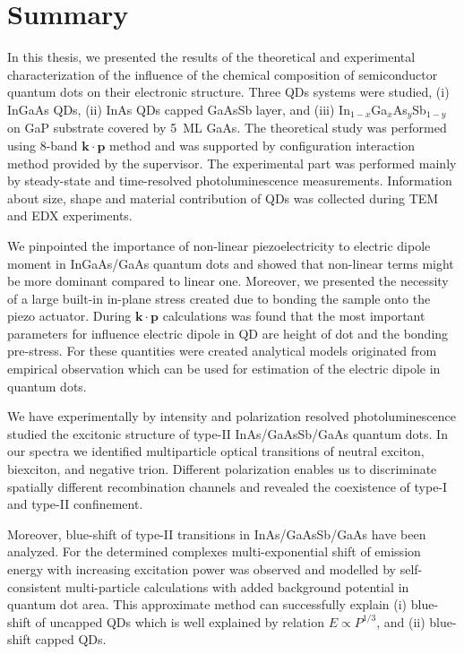 
\chapter{Summary}\label{chap:summary}

In this thesis, we presented the results of the theoretical and experimental characterization of the influence of the chemical composition of semiconductor quantum dots on their electronic structure. Three QDs systems were studied, (i) InGaAs QDs, (ii) InAs QDs capped GaAsSb layer, and (iii) In$_{1-x}$Ga$_x$As$_y$Sb$_{1-y}$ on GaP substrate covered by 5~ML GaAs. The theoretical study was performed using 8-band $\mathbf{k\cdot p}$ method and was supported by configuration interaction method provided by the supervisor. The experimental part was performed mainly by steady-state and time-resolved photoluminescence measurements. Information about size, shape and material contribution of QDs was collected during TEM and EDX experiments.

We pinpointed the importance of non-linear piezoelectricity to electric dipole moment in InGaAs/GaAs quantum dots and showed that non-linear terms might be more dominant compared to linear one. Moreover, we presented the necessity of a large built-in in-plane stress created due to bonding the sample onto the piezo actuator. During $\mathbf{k\cdot p}$ calculations was found that the most important parameters for influence electric dipole in QD are height of dot and the bonding pre-stress. For these quantities were created analytical models originated from empirical observation which can be used for estimation of the electric dipole in quantum dots.

We have experimentally by intensity and polarization resolved photoluminescence studied the excitonic structure of type-II InAs/GaAsSb/GaAs quantum dots. In our spectra we identified multiparticle optical transitions of neutral exciton, biexciton, and negative trion. Different polarization enables us to discriminate spatially different recombination channels and revealed the coexistence of type-I and type-II confinement.

Moreover, blue-shift of type-II transitions in InAs/GaAsSb/GaAs have been analyzed. For the determined complexes multi-exponential shift of emission energy with increasing excitation power was observed and modelled by self-consistent multi-particle calculations with added background potential in quantum dot area. This approximate method can successfully explain (i) blue-shift of uncapped QDs which is well explained by relation $E\propto P^{1/3}$, and (ii) blue-shift capped QDs.


\newpage

\newpage 